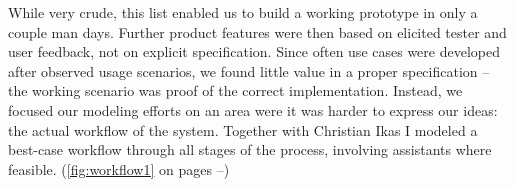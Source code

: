 

While very crude, this list enabled us to build a working prototype in only a couple man days. Further product features were then based on elicited tester and user feedback, not on explicit specification. Since often use cases were developed after observed usage scenarios, we found little value in a proper specification -- the working scenario was proof of the correct implementation. Instead, we focused our modeling efforts on an area were it was harder to express our ideas: the actual workflow of the system. Together with Christian Ikas I modeled a best-case workflow through all stages of the process, involving assistants where feasible. (\autoref{fig:workflow1} on pages \pageref{fig:workflow1}--\pageref{fig:workflow2})

